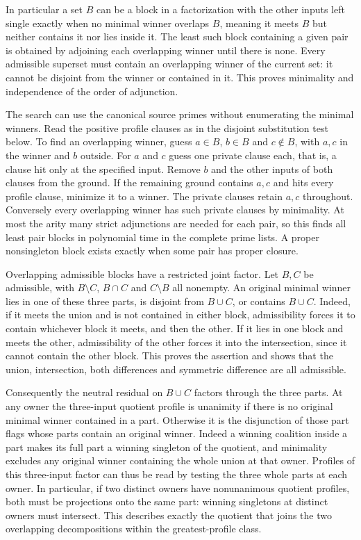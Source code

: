 In particular a set $B$ can be a block in a factorization
with the other inputs left single exactly when no
minimal winner overlaps $B$, meaning it meets $B$
but neither contains it nor lies inside it. The least
such block containing a given pair is obtained by
adjoining each overlapping winner until there is none.
Every admissible superset must contain an overlapping
winner of the current set: it cannot be disjoint from
the winner or contained in it. This proves minimality
and independence of the order of adjunction.

The search can use the canonical source primes without
enumerating the minimal winners. Read the positive
profile clauses as in the disjoint substitution test
below. To find an overlapping winner, guess $a\in B$,
$b\in B$ and $c\notin B$, with $a,c$ in the winner and
$b$ outside. For $a$ and $c$ guess one private clause
each, that is, a clause hit only at the specified input.
Remove $b$ and the other inputs of both clauses from
the ground. If the remaining ground contains $a,c$
and hits every profile clause, minimize it to a
winner. The private clauses retain $a,c$ throughout.
Conversely every overlapping winner has such private
clauses by minimality. At most the arity many strict
adjunctions are needed for each pair, so this finds
all least pair blocks in polynomial time in the
complete prime lists. A proper nonsingleton block
exists exactly when some pair has proper closure.

Overlapping admissible blocks have a restricted joint
factor. Let $B,C$ be admissible, with $B\setminus C$,
$B\cap C$ and $C\setminus B$ all nonempty. An original
minimal winner lies in one of these three parts, is
disjoint from $B\cup C$, or contains $B\cup C$.
Indeed, if it meets the union and is not contained in
either block, admissibility forces it to contain
whichever block it meets, and then the other. If it
lies in one block and meets the other, admissibility
of the other forces it into the intersection, since
it cannot contain the other block. This proves the
assertion and shows that the union, intersection,
both differences and symmetric difference are all
admissible.

Consequently the neutral residual on $B\cup C$
factors through the three parts. At any owner the
three-input quotient profile is unanimity if there
is no original minimal winner contained in a part.
Otherwise it is the disjunction of those part flags
whose parts contain an original winner. Indeed
a winning coalition inside a part makes its full
part a winning singleton of the quotient, and
minimality excludes any original winner containing
the whole union at that owner. Profiles of this
three-input factor can thus be read by testing the
three whole parts at each owner. In particular,
if two distinct owners have nonunanimous quotient
profiles, both must be projections onto the same
part: winning singletons at distinct owners must
intersect. This describes exactly the quotient
that joins the two overlapping decompositions
within the greatest-profile class.

